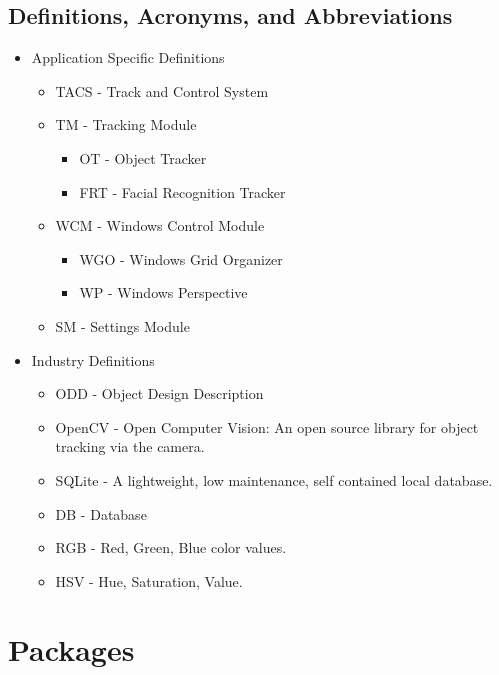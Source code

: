 \documentclass[titlepage]{article}
\begin{document}
\subsection{Definitions, Acronyms, and Abbreviations}
\begin{itemize}
	\item Application Specific Definitions
	\begin{itemize}
		\item TACS - Track and Control System
		\item TM - Tracking Module
		\begin{itemize}
			\item OT - Object Tracker
			\item FRT - Facial Recognition Tracker
		\end{itemize}
		\item WCM - Windows Control Module
		\begin{itemize}
			\item WGO - Windows Grid Organizer
			\item WP - Windows Perspective
		\end{itemize}
		\item SM - Settings Module
	\end{itemize}
	\item Industry Definitions
	\begin{itemize}
		\item ODD - Object Design Description
		\item OpenCV - Open Computer Vision: An open source library for object tracking via the camera.
		\item SQLite - A lightweight, low maintenance, self contained local database.
		\item DB - Database
		\item RGB - Red, Green, Blue color values.
		\item HSV - Hue, Saturation, Value.
	\end{itemize}
\end{itemize}

\section{Packages}
\end{document}
